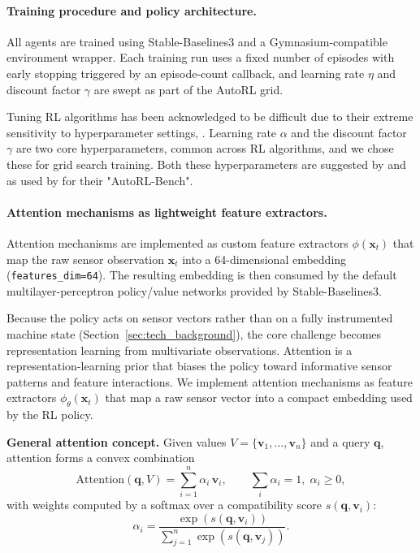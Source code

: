 \documentclass[sn-basic]{sn-jnl} %
\begin{document}
\paragraph{Training procedure and policy architecture.}
All agents are trained using Stable-Baselines3 and a Gymnasium-compatible environment wrapper. Each training run uses a fixed number of episodes with early stopping triggered by an episode-count callback, and learning rate $\eta$ and discount factor $\gamma$ are swept as part of the AutoRL grid.

Tuning RL algorithms has been acknowledged to be difficult due to their extreme sensitivity to hyperparameter settings, \cite{Henderson2019}. Learning rate $\alpha$ and the discount factor $\gamma$ are two core hyperparameters, common across RL algorithms, and we chose these for grid search training. Both these hyperparameters are suggested by \cite{Shala2022AutoRL, Eimer2023, Francois2016} and as used by \cite{Shala2022AutoRL} for their "AutoRL-Bench".


\paragraph{Attention mechanisms as lightweight feature extractors.}
\label{sec:attention}

Attention mechanisms are implemented as custom feature extractors $\phi(\mathbf{x}_t)$ that map the raw sensor observation $\mathbf{x}_t$ into a 64-dimensional embedding (\texttt{features\_dim=64}). The resulting embedding is then consumed by the default multilayer-perceptron policy/value networks provided by Stable-Baselines3.

Because the policy acts on sensor vectors rather than on a fully instrumented machine state (Section~\ref{sec:tech_background}), the core challenge becomes representation learning from multivariate observations. Attention is a representation-learning prior that biases the policy toward informative sensor patterns and feature interactions. We implement attention mechanisms as feature extractors $\phi_\theta(\mathbf{x}_t)$ that map a raw sensor vector into a compact embedding used by the RL policy.

\textbf{General attention concept.}
Given values $V=\{\mathbf{v}_1,\ldots,\mathbf{v}_n\}$ and a query $\mathbf{q}$, attention forms a convex combination
\begin{equation}
\mathrm{Attention}(\mathbf{q},V)=\sum_{i=1}^{n}\alpha_i\,\mathbf{v}_i,\qquad \sum_i\alpha_i=1,\;\alpha_i\ge 0,
\end{equation}
with weights computed by a softmax over a compatibility score $s(\mathbf{q},\mathbf{v}_i)$:
\begin{equation}
\alpha_i = \frac{\exp(s(\mathbf{q},\mathbf{v}_i))}{\sum_{j=1}^n\exp(s(\mathbf{q},\mathbf{v}_j))}.
\end{equation}
\end{document}
